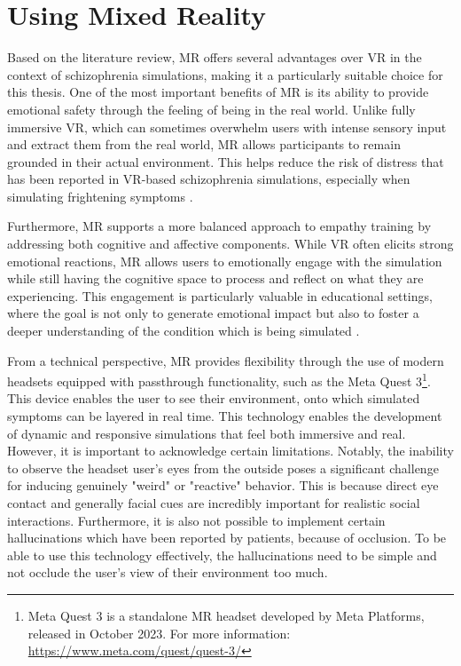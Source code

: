 \section{Using Mixed Reality}

Based on the literature review, MR offers several advantages over VR in the context of schizophrenia simulations, making it a particularly suitable choice for this thesis. One of the most important benefits of MR is its ability to provide emotional safety through the feeling of being in the real world. Unlike fully immersive VR, which can sometimes overwhelm users with intense sensory input and extract them from the real world, MR allows participants to remain grounded in their actual environment. This helps reduce the risk of distress that has been reported in VR-based schizophrenia simulations, especially when simulating frightening symptoms \cite{Zare-Bidaki2022}.

\vspace{1em}

Furthermore, MR supports a more balanced approach to empathy training by addressing both cognitive and affective components. While VR often elicits strong emotional reactions, MR allows users to emotionally engage with the simulation while still having the cognitive space to process and reflect on what they are experiencing. This engagement is particularly valuable in educational settings, where the goal is not only to generate emotional impact but also to foster a deeper understanding of the condition which is being simulated \cite{Martingano2021, Rueda2020,Krogmeier2024}.

\vspace{1em}

From a technical perspective, MR provides flexibility through the use of modern headsets equipped with passthrough functionality, such as the Meta Quest 3\footnote{Meta Quest 3 is a standalone MR headset developed by Meta Platforms, released in October 2023. For more information: \url{https://www.meta.com/quest/quest-3/}}. This device enables the user to see their environment, onto which simulated symptoms can be layered in real time. This technology enables the development of dynamic and responsive simulations that feel both immersive and real. However, it is important to acknowledge certain limitations. Notably, the inability to observe the headset user's eyes from the outside poses a significant challenge for inducing genuinely "weird" or "reactive" behavior. This is because direct eye contact and generally facial cues are incredibly important for realistic social interactions. Furthermore, it is also not possible to implement certain hallucinations which have been reported by patients, because of occlusion. To be able to use this technology effectively, the hallucinations need to be simple and not occlude the user's view of their environment too much. 


